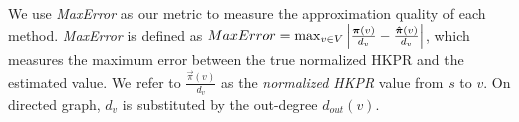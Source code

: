 We use {\em MaxError} as our metric to measure the approximation quality of each method. {\em MaxError} is defined as $MaxError =\max_{v \in V}\left|\frac{\bm{\pi}(v)}{d_v}-\frac{\bm{\bm{\hat{\pi}}}(v)}{d_v}\right|$, which measures the maximum error between the true normalized HKPR and the estimated value. We refer to $\frac{\vec{\pi}(v)}{d_{v}} $ as the {\em normalized HKPR} value from $s$ to $v$. %
On directed graph, $d_v$ is substituted by the out-degree $d_{out}(v)$. 
 

